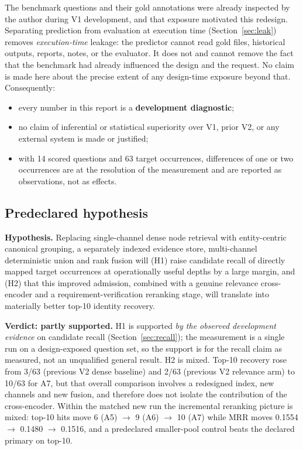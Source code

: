 \documentclass[11pt,a4paper]{article}
\begin{document}
The benchmark questions and their gold annotations were already inspected by the author during V1
development, and that exposure motivated this redesign. Separating prediction from evaluation at execution
time (Section~\ref{sec:leak}) removes \emph{execution-time} leakage: the predictor cannot read gold files,
historical outputs, reports, notes, or the evaluator. It does not and cannot remove the fact that the
benchmark had already influenced the design and the request. No claim is made here about the precise extent
of any design-time exposure beyond that. Consequently:

\begin{itemize}
\item every number in this report is a \textbf{development diagnostic};
\item no claim of inferential or statistical superiority over V1, prior V2, or any external system is made
or justified;
\item with 14 scored questions and 63 target occurrences, differences of one or two occurrences are at the
resolution of the measurement and are reported as observations, not as effects.
\end{itemize}

\subsection{Predeclared hypothesis}

\textbf{Hypothesis.} Replacing single-channel dense node retrieval with entity-centric canonical grouping,
a separately indexed evidence store, multi-channel deterministic union and rank fusion will (H1) raise
candidate recall of directly mapped target occurrences at operationally useful depths by a large margin, and
(H2) that this improved admission, combined with a genuine relevance cross-encoder and a
requirement-verification reranking stage, will translate into materially better top-10 identity recovery.

\textbf{Verdict: partly supported.} H1 is supported \emph{by the observed development evidence} on candidate
recall (Section~\ref{sec:recall}); the measurement is a single run on a design-exposed question set, so the
support is for the recall claim as measured, not an unqualified general result. H2 is mixed. Top-10 recovery
rose from 3/63 (previous V2 dense baseline) and 2/63 (previous V2 relevance arm) to 10/63 for A7, but that
overall comparison involves a redesigned index, new channels and new fusion, and therefore does not isolate
the contribution of the cross-encoder. Within the matched new run the incremental reranking picture is
mixed: top-10 hits move 6 (A5) $\to$ 9 (A6) $\to$ 10 (A7) while MRR moves 0.1554 $\to$ 0.1480 $\to$ 0.1516,
and a predeclared smaller-pool control beats the declared primary on top-10.
\end{document}
